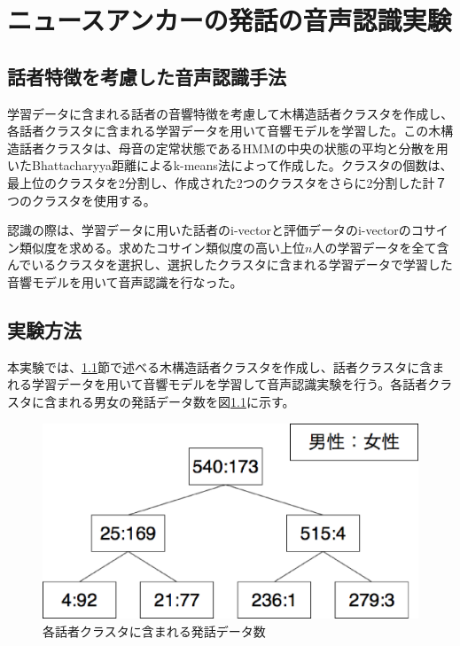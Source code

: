 \chapter{ニュースアンカーの発話の音声認識実験}
\label{chapter:speech_recog}


\section{話者特徴を考慮した音声認識手法\cite{yoshimura_clustering}}
\label{section:yoshimura_pre_clustering}
学習データに含まれる話者の音響特徴を考慮して木構造話者クラスタを作成し、各話者クラスタに含まれる学習データを用いて音響モデルを学習した。この木構造話者クラスタは、母音の定常状態であるHMMの中央の状態の平均と分散を用いたBhattacharyya距離によるk-means法によって作成した。クラスタの個数は、最上位のクラスタを2分割し、作成された2つのクラスタをさらに2分割した計７つのクラスタを使用する。\par
認識の際は、学習データに用いた話者のi-vectorと評価データのi-vectorのコサイン類似度を求める。求めたコサイン類似度の高い上位$n$人の学習データを全て含んでいるクラスタを選択し、選択したクラスタに含まれる学習データで学習した音響モデルを用いて音声認識を行なった。\par

\section{実験方法}
本実験では、\ref{section:yoshimura_pre_clustering}節で述べる木構造話者クラスタを作成し、話者クラスタに含まれる学習データを用いて音響モデルを学習して音声認識実験を行う。各話者クラスタに含まれる男女の発話データ数を図\ref{fig:yoshimura_kikouzou}に示す。


\begin{figure}[H]
  \begin{center}
    \includegraphics[scale=0.5]{./figure/yoshimura.eps}
  \end{center}
  \caption{各話者クラスタに含まれる発話データ数 \label{fig:yoshimura_kikouzou}}
\end{figure}

